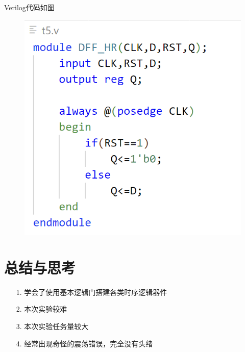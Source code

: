 \documentclass{article}
\begin{document}
    Verilog代码如图
    \begin{figure}[htbp]
        \centering
        \includegraphics[scale=0.8]{t5v.png}
    \end{figure}
    \clearpage
   \section{总结与思考}
    \begin{enumerate}
        \item [1.]学会了使用基本逻辑门搭建各类时序逻辑器件
        \item [2.]本次实验较难
        \item [3.]本次实验任务量较大
        \item [4.]经常出现奇怪的震荡错误，完全没有头绪
    \end{enumerate}
\end{document}
